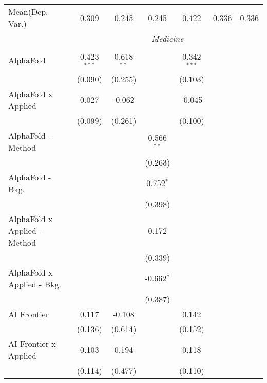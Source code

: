 \begin{tabular}{lcccccc}
Mean(Dep. Var.) & 0.309 & 0.245 & 0.245 & 0.422 & 0.336 & 0.336 \\
 & \multicolumn{6}{c}{\textit{Medicine}} \\ \\
   AlphaFold                      & 0.423$^{***}$ & 0.618$^{**}$ &               & 0.342$^{***}$ &        &   \\   
                                  & (0.090)       & (0.255)      &               & (0.103)       &        &   \\   
   AlphaFold x Applied            & 0.027         & -0.062       &               & -0.045        &        &   \\   
                                  & (0.099)       & (0.261)      &               & (0.100)       &        &   \\   
   AlphaFold - Method             &               &              & 0.566$^{**}$  &               &        &   \\   
                                  &               &              & (0.263)       &               &        &   \\   
   AlphaFold - Bkg.               &               &              & 0.752$^{*}$   &               &        &   \\   
                                  &               &              & (0.398)       &               &        &   \\   
   AlphaFold x Applied - Method   &               &              & 0.172         &               &        &   \\   
                                  &               &              & (0.339)       &               &        &   \\   
   AlphaFold x Applied - Bkg.     &               &              & -0.662$^{*}$  &               &        &   \\   
                                  &               &              & (0.387)       &               &        &   \\   
   AI Frontier                    & 0.117         & -0.108       &               & 0.142         &        &   \\   
                                  & (0.136)       & (0.614)      &               & (0.152)       &        &   \\   
   AI Frontier x Applied          & 0.103         & 0.194        &               & 0.118         &        &   \\   
                                  & (0.114)       & (0.477)      &               & (0.110)       &        &   \\   

\end{tabular}
